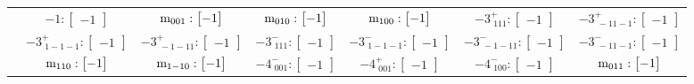 \documentclass[fleqn,8pt,landscape]{jsarticle}
\begin{document}
\begin{longtable}{ccccccc}
& $ -1:\begin{bmatrix} -1 \end{bmatrix} $ & $ {\rm m}_{001}:\begin{bmatrix} -1 \end{bmatrix} $ & $ {\rm m}_{010}:\begin{bmatrix} -1 \end{bmatrix} $ & $ {\rm m}_{100}:\begin{bmatrix} -1 \end{bmatrix} $ & $ -3^{+}_{\,\,111}:\begin{bmatrix} -1 \end{bmatrix} $ & $ -3^{+}_{\,\,-11-1}:\begin{bmatrix} -1 \end{bmatrix} $ \\
& $ -3^{+}_{\,\,1-1-1}:\begin{bmatrix} -1 \end{bmatrix} $ & $ -3^{+}_{\,\,-1-11}:\begin{bmatrix} -1 \end{bmatrix} $ & $ -3^{-}_{\,\,111}:\begin{bmatrix} -1 \end{bmatrix} $ & $ -3^{-}_{\,\,1-1-1}:\begin{bmatrix} -1 \end{bmatrix} $ & $ -3^{-}_{\,\,-1-11}:\begin{bmatrix} -1 \end{bmatrix} $ & $ -3^{-}_{\,\,-11-1}:\begin{bmatrix} -1 \end{bmatrix} $ \\
& $ {\rm m}_{110}:\begin{bmatrix} -1 \end{bmatrix} $ & $ {\rm m}_{1-10}:\begin{bmatrix} -1 \end{bmatrix} $ & $ -4^{-}_{\,\,001}:\begin{bmatrix} -1 \end{bmatrix} $ & $ -4^{+}_{\,\,001}:\begin{bmatrix} -1 \end{bmatrix} $ & $ -4^{-}_{\,\,100}:\begin{bmatrix} -1 \end{bmatrix} $ & $ {\rm m}_{011}:\begin{bmatrix} -1 \end{bmatrix} $ \\

\end{longtable}
\end{document}
